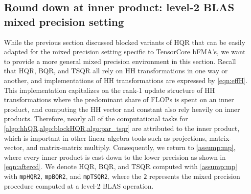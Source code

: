 \subsection{Round down at inner product: level-2 BLAS mixed precision setting}\label{sec:mp-2}
While the previous section discussed blocked variants of HQR that can be easily adapted for the mixed precision setting specific to TensorCore bFMA's, we want to provide a more general mixed precision environment in this section.
Recall that HQR, BQR, and TSQR all rely on HH transformations in one way or another, and implementations of HH transformations are expressed by \cref{eqn:effH}.
This implementation capitalizes on the rank-1 update structure of HH transformations where the predominant share of FLOPs is spent on an inner product, and computing the HH vector and constant also rely heavily on inner products.
Therefore, nearly all of the computational tasks for \cref{algo:hhQR,algo:blockHQR,algo:par_tsqr} are attributed to the inner product, which is important in other linear algebra tools such as projections, matrix-vector, and matrix-matrix multiply.
Consequently, we return to \cref{assump:mp}, where every inner product is cast down to the lower precision as shown in \cref{eqn:aftercd}. 
We denote HQR, BQR, and TSQR computed with \cref{assump:mp} with {\tt mpHQR2}, {\tt mpBQR2}, and {\tt mpTSQR2}, where the {\tt 2} represents the mixed precision procedure computed at a level-2 BLAS operation.
